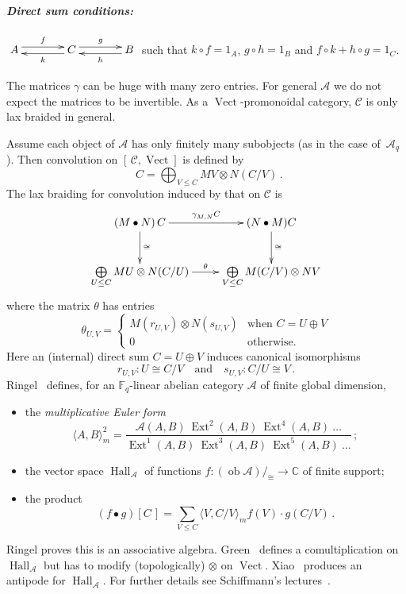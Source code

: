 \documentclass[a4paper,12pt]{article}
\theoremstyle{definition}
\theoremstyle{fact}
\theoremstyle{genquest}
\theoremstyle{step}
\newcommand{\catA}{\mathcal{A}}
\newcommand{\catC}{\mathcal{C}}
\newcommand{\CC}{\mathbb{C}}
\newcommand{\FF}{\mathbb{F}}
\newcommand{\Ext}{\operatorname{Ext}}
\newcommand{\Hall}{\operatorname{Hall}}
\newcommand{\Vect}{\operatorname{Vect}}
\newcommand{\ob}{\operatorname{ob}}
\newcommand{\longto}{\longrightarrow}
\begin{document}
\paragraph*{\it Direct sum conditions\/\upshape:}
%
$ \xymatrix @C+5mm{
 A \ar @<3pt> [r]^f  
 & C \ar @<3pt> [r]^g \ar @<3pt>[l]^k
 & B \ar @<3pt> [l]^h
}$
such that $ k \circ f = 1_A$, $g \circ h = 1_B$ and  $f \circ k + h \circ g = 1_C$.

\medskip\noindent
The matrices $\gamma$ can be huge with many zero entries.    
For general $\catA$ we do not expect the matrices to be invertible.    
As a $\Vect$-promonoidal category, $\catC$ is only lax braided in general.

\medskip
Assume each object of $\catA$ has only finitely many subobjects (as in the case of~$\catA_q$).   
Then convolution on $[\,\catC,\Vect]$ is defined by
\[
\mathop{(M \bullet N)}C = \bigoplus_{V \leq C} MV \otimes N(C/V)\,.
\]
The lax braiding for convolution induced by that on $\catC$ is
\[
\xymatrix{\mathop{(M \bullet N)} C   \ar[d]^{\cong}   \ar[r]^-{\gamma^{}_{M,N} C} & (N \bullet M)C  \ar[d]^{\cong} \\
 \bigoplus\limits_{U\leq C} MU \otimes N (C/U)  \ar[r]^-\theta & \bigoplus\limits_{V\leq C} M(C/V)\otimes NV}
\]
where the matrix $\theta$ has entries
\[
\theta_{U,V} = \begin{cases}
M(r_{U,V})\otimes N(s_{U,V}) & \text{when } C= U \oplus V \\
      0 & \mbox{otherwise}.
\end{cases}
\]
Here an (internal) direct sum $C= U \oplus V$ induces canonical isomorphisms
\[
r_{U,V} : U \cong C/V \quad \mbox{and} \quad s_{U,V} : C/U \cong V\,.
\]
Ringel~\cite{Ringel1990} defines, for an $\FF_q$-linear abelian category $\catA$ of finite global dimension,
\begin{itemize}
\item %
the \emph{multiplicative Euler form}
\[
\langle A,B \rangle^2_m = \frac{\catA(A,B) \ \Ext^2 (A,B) \ \Ext^4 (A,B)\ \ldots}{\Ext^1(A,B) \ \Ext^3(A,B) \ \Ext^5(A,B) \ \ldots}\,;
\]
\item %
the vector space $\Hall_{\catA}$ of functions
$ f : (\ob \catA)/_{\cong} \longto \CC $ of finite support;
\item %
the product
\[
(f  \bullet g) [C\,]
 = \sum_{V \leq C} \langle V,C/V \rangle_m f(V) \cdot g (C/V)\,.
\]
\end{itemize}

Ringel proves this is an associative algebra. 
Green~\cite{Green1995} defines a comultiplication on $\Hall_\catA$ but has to modify (topologically) $\otimes$ on $\Vect$. 
Xiao~\cite{Xiao1997} produces an antipode for $\Hall _\catA$. For further details see Schiffmann's lectures~\cite{Schiff}.
\end{document}
